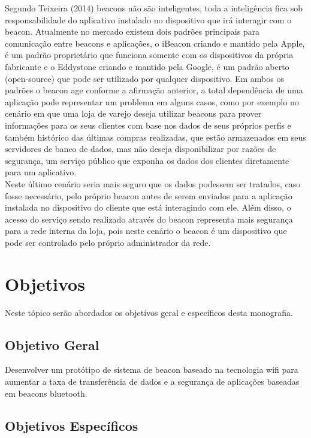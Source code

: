 Segundo Teixeira (2014) beacons não são inteligentes, toda a inteligência fica sob responsabilidade do aplicativo instalado no dispositivo que irá interagir com o beacon. Atualmente no mercado existem dois padrões principais para comunicação entre beacons e aplicações, o iBeacon criando e mantido pela Apple, é um padrão proprietário que funciona somente com os dispositivos da própria fabricante e o Eddystone criando e mantido pela Google, é um padrão aberto (open-source) que pode ser utilizado por qualquer dispositivo. Em ambos os padrões o beacon age conforme a afirmação anterior, a total dependência de uma aplicação pode representar um problema em alguns casos, como por exemplo no cenário em que uma loja de varejo deseja utilizar beacons para prover informações para os seus clientes com base nos dados de seus próprios perfis e também histórico das últimas compras realizadas, que estão armazenados em seus servidores de banco de dados, mas não deseja disponibilizar por razões de segurança, um serviço público que exponha os dados dos clientes diretamente para um aplicativo. \\
\indent Neste último cenário seria mais seguro que os dados podessem ser tratados, caso fosse necessário, pelo próprio beacon antes de serem enviados para a aplicação instalada no dispositivo do cliente que está interagindo com ele. Além disso, o acesso do serviço sendo realizado através do beacon representa mais segurança para a rede interna da loja, pois neste cenário o beacon é um dispositivo que pode ser controlado pelo próprio administrador da rede.

\section{Objetivos}
\label{sec:objetivos}

Neste tópico serão abordados os objetivos geral e específicos desta monografia.

\subsection{Objetivo Geral}
\label{sec:objetivo-geral}

Desenvolver um protótipo de sistema de beacon baseado na tecnologia wifi para aumentar a taxa de transferência de dados e a segurança de aplicações baseadas em beacons bluetooth.

\subsection{Objetivos Específicos}
\label{sec:objetivos-especificos}

